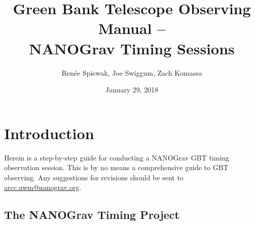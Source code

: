 \documentclass[11pt, reqno, tbtags]{article}
\begin{document}
\title{Green Bank Telescope Observing Manual -- \\
 NANOGrav Timing Sessions}
\author{Ren\'ee Spiewak, Joe Swiggum, Zach Komassa}

\date{January 29, 2018}                                           %

\maketitle 
{}
\tableofcontents


\section{Introduction}  %
Herein is a step-by-step guide for conducting a NANOGrav GBT timing observation session. This is by no means a comprehensive guide to GBT observing.  Any suggestions for revisions should be sent to \href{mailto:arcc.uwm@nanograv.org}{arcc.uwm@nanograv.org}.  

\subsection{The NANOGrav Timing Project} %
\end{document}
